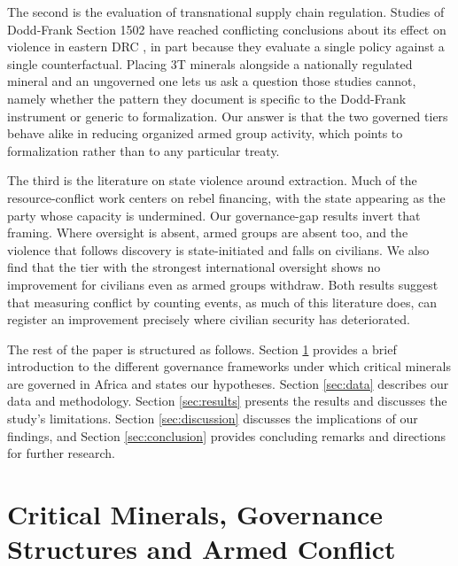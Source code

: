 \documentclass[11pt]{article}
\begin{document}
The second is the evaluation of transnational supply chain regulation. Studies of Dodd-Frank Section 1502 have reached conflicting conclusions about its effect on violence in eastern DRC \citep{parker2016resource, stoop2018dodd, bloem2022conflict}, in part because they evaluate a single policy against a single counterfactual. Placing 3T minerals alongside a nationally regulated mineral and an ungoverned one lets us ask a question those studies cannot, namely whether the pattern they document is specific to the Dodd-Frank instrument or generic to formalization. Our answer is that the two governed tiers behave alike in reducing organized armed group activity, which points to formalization rather than to any particular treaty.

The third is the literature on state violence around extraction. Much of the resource-conflict work centers on rebel financing, with the state appearing as the party whose capacity is undermined. Our governance-gap results invert that framing. Where oversight is absent, armed groups are absent too, and the violence that follows discovery is state-initiated and falls on civilians. We also find that the tier with the strongest international oversight shows no improvement for civilians even as armed groups withdraw. Both results suggest that measuring conflict by counting events, as much of this literature does, can register an improvement precisely where civilian security has deteriorated.

The rest of the paper is structured as follows. Section \ref{sec:governance} provides a brief introduction to the different governance frameworks under which critical minerals are governed in Africa and states our hypotheses. Section \ref{sec:data} describes our data and methodology. Section \ref{sec:results} presents the results and discusses the study's limitations. Section \ref{sec:discussion} discusses the implications of our findings, and Section \ref{sec:conclusion} provides concluding remarks and directions for further research.

\section{Critical Minerals, Governance Structures and Armed Conflict}
\label{sec:governance}

\end{document}

